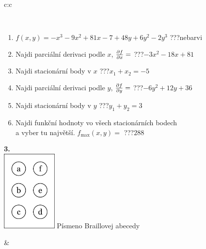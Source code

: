 \documentclass[10pt]{report}
\begin{document}
\begin{tabular}{c:c}
\begin{minipage}[c][104.5mm][t]{0.5\linewidth}
\begin{center}
\begin{minipage}{0.95\linewidth}
\begin{center}
\end{center}
\end{minipage}
\\[1mm]
\begin{minipage}{0.79\linewidth}
\begin{center}
\begin{varwidth}{\linewidth}
\begin{enumerate}
\normalsize
\item $f(x,y)=-x^3-9x^2+81x-7+48y+6y^2-2y^3$\quad \dotfill\; ???\;\dotfill \quad nebarvi
\item Najdi parciální derivaci podle $x$, $\pdv{f}{x}=$\quad \dotfill\; ???\;\dotfill \quad $-3x^2-18x+81$
\item Najdi stacionární body v $x$\quad \dotfill\; ???\;\dotfill \quad $x_1+x_2=-5$
\item Najdi parciální derivaci podle $y$, $\pdv{f}{y}=$\quad \dotfill\; ???\;\dotfill \quad $-6y^2+12y+36$
\item Najdi stacionární body v $y$\quad \dotfill\; ???\;\dotfill \quad $y_1+y_2=3$
\item Najdi funkční hodnoty vo všech stacionárních bodech \\ \phantom{xxxxxx} a vyber tu najvětší. $f_{\text{max}}(x,y)=$\quad \dotfill\; ???\;\dotfill \quad $288$
\end{enumerate}
\end{varwidth}
\end{center}
\end{minipage}
\begin{minipage}{0.20\linewidth}
\begin{center}
{\Huge\bfseries 3.} \\[2mm]
\includegraphics[height=40mm]{../images/braille.png}
{\small Písmeno Braillovej abecedy}
\end{center}
\end{minipage}
\end{center}
\end{minipage}
&
\begin{minipage}[c][104.5mm][t]{0.5\linewidth}
\begin{center}

\end{center}
\end{minipage}
\end{tabular}
\end{document}
